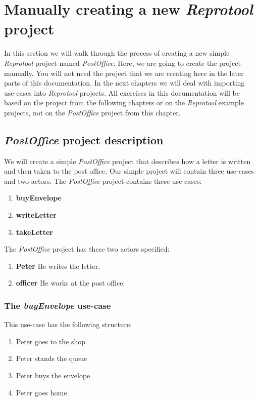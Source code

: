 \section{Manually creating a new \emph{Reprotool} project}

In this section we will walk through the process of creating a new simple \emph{Reprotool} project named \emph{PostOffice}.
Here, we are going to create the project manually. You will not need the project that we are creating here in the later parts
of this documentation. In the next chapters we will deal with importing use-cases into \emph{Reprotool} projects.
All exercises in this documentation will be based on the project from the following chapters or on the \emph{Reprotool} example projects,
not on the \emph{PostOffice} project from this chapter.

\subsection{\emph{PostOffice} project description}
We will create a simple \emph{PostOffice} project that describes how a letter is written and then taken to the post office.
Our simple project will contain three use-cases and two actors. The \emph{PostOffice} project contains these use-cases:

\begin{enumerate}
 \item {\bf buyEnvelope}
 \item {\bf writeLetter}
 \item {\bf takeLetter}
\end{enumerate}

The \emph{PostOffice} project has these two actors specified:

\begin{enumerate}
 \item {\bf Peter} He writes the letter.
 \item {\bf officer} He works at the post office.
\end{enumerate}

\subsubsection{The \emph{buyEnvelope} use-case}

This use-case has the following structure:

\begin{enumerate}
 \item Peter goes to the shop
 \item Peter stands the queue
 \item Peter buys the envelope
 \item Peter goes home
\end{enumerate}

